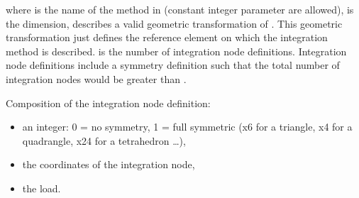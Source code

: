 \documentclass[a4paper,11pt,english]{sphinxmanual}
\begin{document}
\begin{sphinxVerbatim}[commandchars=\\\{\}]
  
  
  
  
    
    
    
    
   
\end{sphinxVerbatim}

where  is the name of the method in  (constant integer parameter are
allowed),  is the dimension,  describes a valid geometric
transformation of . This geometric transformation just defines the reference
element on which the integration method is described.  is the number of
integration node definitions. Integration node definitions include a symmetry
definition such that the total number of integration nodes would be greater than
.

Composition of the integration node definition:
\begin{itemize}
\item {} 
an integer: 0 = no symmetry, 1 = full symmetric (x6 for a triangle, x4 for a
quadrangle, x24 for a tetrahedron …),

\item {} 
the  coordinates of the integration node,

\item {} 
the load.

\end{itemize}
\end{document}
